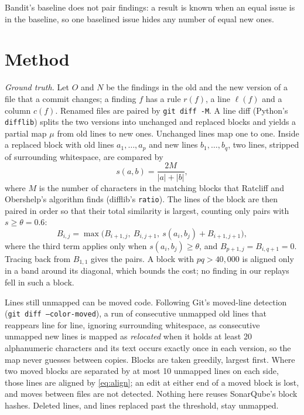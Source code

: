 \documentclass[conference]{IEEEtran}
\begin{document}
Bandit's baseline does not pair findings: a result is known when an equal issue is in
the baseline, so one baselined issue hides any number of equal new ones.

\section{Method}\label{sec:method}

\textit{Ground truth.} Let $O$ and $N$ be the findings in the old and the new version of
a file that a commit changes; a finding $f$ has a rule $r(f)$, a line $\ell(f)$ and a
column $c(f)$. Renamed files are paired by \texttt{git diff -M}. A line diff (Python's
\texttt{difflib}) splits the two versions into unchanged and replaced blocks and yields
a partial map $\mu$ from old lines to new ones. Unchanged lines map one to one. Inside a
replaced block with old lines $a_1, \dots, a_p$ and new lines $b_1, \dots, b_q$, two
lines, stripped of surrounding whitespace, are compared by
\begin{equation}\label{eq:sim}
s(a, b) = \frac{2M}{|a| + |b|},
\end{equation}
where $M$ is the number of characters in the matching blocks that Ratcliff and
Obershelp's algorithm finds (difflib's \texttt{ratio}). The lines of the block are then
paired in order so that their total similarity is largest, counting only pairs with
$s \ge \theta = 0.6$:
\begin{equation}\label{eq:align}
B_{i,j} = \max \bigl( B_{i+1,j},\ B_{i,j+1},\ s(a_i, b_j) + B_{i+1,j+1} \bigr),
\end{equation}
where the third term applies only when $s(a_i, b_j) \ge \theta$, and
$B_{p+1,j} = B_{i,q+1} = 0$. Tracing back from $B_{1,1}$ gives the pairs. A block with
$pq > 40{,}000$ is aligned only in a band around its diagonal, which bounds the cost; no
finding in our replays fell in such a block.

Lines still unmapped can be moved code. Following Git's moved-line detection
(\texttt{git diff --color-moved}), a run of consecutive unmapped old lines that
reappears line for line, ignoring surrounding whitespace, as consecutive unmapped new
lines is mapped as \emph{relocated} when it holds at least 20 alphanumeric characters and
its text occurs exactly once in each version, so the map never guesses between copies.
Blocks are taken greedily, largest first. Where two moved blocks are separated by at most
10 unmapped lines on each side, those lines are aligned by \eqref{eq:align}; an edit at
either end of a moved block is lost, and moves between files are not detected. Nothing
here reuses SonarQube's block hashes. Deleted lines, and lines replaced past the
threshold, stay unmapped.
\end{document}
